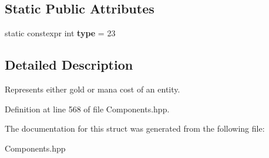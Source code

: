 \subsection*{Static Public Attributes}
\begin{DoxyCompactItemize}
\item 
static constexpr int {\bfseries type} = 23\hypertarget{struct_price_component_aa93ef46a1b17086f36590ec57f0e6c76}{}\label{struct_price_component_aa93ef46a1b17086f36590ec57f0e6c76}

\end{DoxyCompactItemize}


\subsection{Detailed Description}
Represents either gold or mana cost of an entity. 

Definition at line 568 of file Components.\+hpp.



The documentation for this struct was generated from the following file\+:\begin{DoxyCompactItemize}
\item 
Components.\+hpp\end{DoxyCompactItemize}
